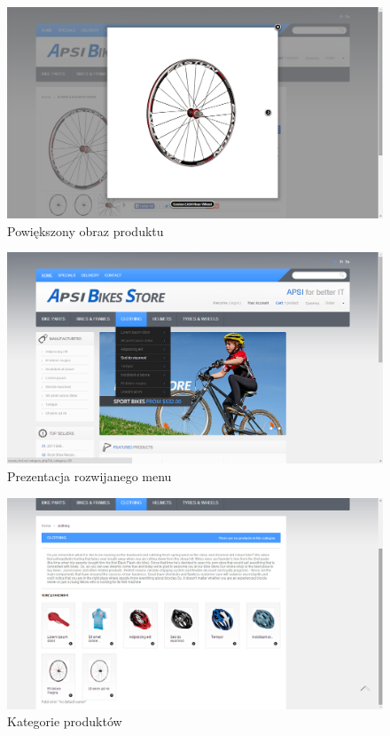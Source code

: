\begin{figure}[h!]
  \centering
    \includegraphics[width=\textwidth]{graphics/ui/ProductImage.png}
  \caption{Powiększony obraz produktu}
\end{figure}

\begin{figure}[h!]
  \centering
    \includegraphics[width=\textwidth]{graphics/ui/MenuPresentation.png}
  \caption{Prezentacja rozwijanego menu}
\end{figure}

\begin{figure}[h!]
  \centering
    \includegraphics[width=\textwidth]{graphics/ui/Categories.png}
  \caption{Kategorie produktów}
\end{figure}

